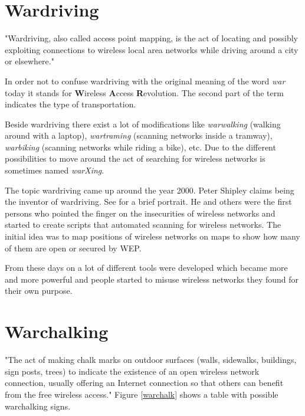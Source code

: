 \section{Wardriving}

"Wardriving, also called access point mapping, is the act of locating and possibly exploiting connections to wireless local area networks while driving around a city or elsewhere." \cite{wardrivingdef}

In order not to confuse wardriving with the original meaning of the word {\em war} today it stands for {\bf W}ireless {\bf A}ccess {\bf R}evolution. The second part of the term indicates the type of transportation. 

Beside wardriving there exist a lot of modifications like {\em warwalking} (walking around with a laptop), {\em wartraming} (scanning networks inside a tramway), {\em warbiking} (scanning networks while riding a bike), etc. Due to the different possibilities to move around the act of searching for wireless networks is sometimes named {\em warXing}.

The topic wardriving came up around the year 2000. Peter Shipley claims being the inventor of wardriving. See \cite{shipley} for a brief portrait. He and others were the first persons who pointed the finger on the insecurities of wireless networks and started to create scripts that automated scanning for wireless networks. The initial idea was to map positions of wireless networks on maps to show how many of them are open or secured by WEP.

From these days on a lot of different tools were developed which became more and more powerful and people started to misuse wireless networks they found for their own purpose.

\section{Warchalking}

"The act of making chalk marks on outdoor surfaces (walls, sidewalks, buildings, sign posts, trees) to indicate the existence of an open wireless network connection, usually offering an Internet connection so that others can benefit from the free wireless access." \cite{warchalkingdef} Figure \ref{warchalk} shows a table with possible warchalking signs.

